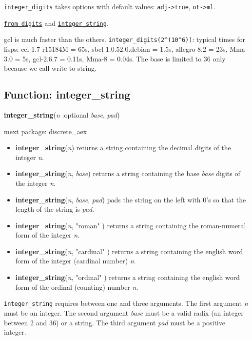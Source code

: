 \documentclass[]{article}
\begin{document}
\vspace{5 pt}

{\tt integer\_digits} takes options with default values: {\tt adj->true}, {\tt ot->ml}.
\vspace{5 pt}


 \hyperlink{from_digits}{{\tt from\_digits}} and \hyperlink{integer_string}{{\tt integer\_string}}.

\vspace{5 pt}


gcl is much faster than the others. \verb#integer_digits(2^(10^6))#: typical times for lisps: ccl-1.7-r15184M = 65s, sbcl-1.0.52.0.debian = 1.5s, allegro-8.2 = 23s, Mma-3.0 = 5s, gcl-2.6.7 = 0.11s, Mma-8 = 0.04s. The base is limited to 36 only because we call write-to-string. 

\vspace{5 pt}


\subsection{Function: integer\_string\label{sec:integer_string}}
\hypertarget{integer_string}{}
{\bf integer\_string}({\it n} :optional {\it base}, {\it pad})


\noindent mext package: discrete\_aex



\vspace{5 pt}
\begin{itemize}
\item[] {\bf integer\_string}({\it n})
  returns a string containing the decimal digits of the integer {\it n}. 

\item[] {\bf integer\_string}({\it n}, {\it base})
  returns a string containing the base {\it base} digits of the integer {\it n}. 

\item[] {\bf integer\_string}({\it n}, {\it base}, {\it pad})
  pads the string on the left with 0's so that the length of the string is {\it pad}. 

\item[] {\bf integer\_string}({\it n}, "roman" )
  returns a string containing the roman-numeral form of the integer {\it n}. 

\item[] {\bf integer\_string}({\it n}, "cardinal" )
  returns a string containing the english word form of the integer (cardinal number) {\it n}. 

\item[] {\bf integer\_string}({\it n}, "ordinal" )
  returns a string containing the english word form of the ordinal (counting) number {\it n}. 

\end{itemize}
   {\tt integer\_string} requires between one and three arguments.
    The first argument {\it n} must be an integer.
    The second argument {\it base} must be a valid radix (an integer between 2 and 36) or a string.
    The third argument {\it pad} must be a positive integer.
\end{document}
